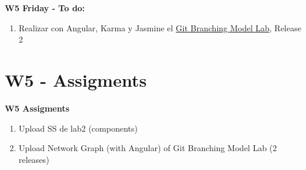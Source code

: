 \documentclass{beamer}
\begin{document}
\begin{frame}

\textbf{W5 Friday - To do:}

\begin{enumerate}
\item
	Realizar con Angular, Karma y Jasmine el 	\href{https://github.com/adsoftsito/tdd/blob/master/w3/gitbranchinglab.pdf}{Git Branching Model Lab}, Release 2
	
\end{enumerate} 


\end{frame}



\section{W5 - Assigments }

\begin{frame}


\textbf{W5 Assigments}


\begin{enumerate}
\item
	Upload SS de lab2 (components)
\item
	Upload Network Graph (with Angular) of Git Branching Model Lab (2 releases)

\end{enumerate} 


\end{frame}
\end{document}
